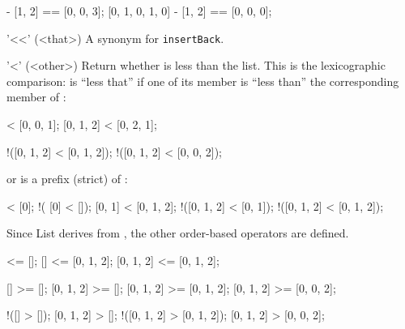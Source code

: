 \begin{urbiscriptapi}
\begin{urbiassert}
[0, 1, 0, 2, 3] - [1, 2] == [0, 0, 3];
[0, 1, 0, 1, 0] - [1, 2] == [0, 0, 0];
\end{urbiassert}

\item['<<'](<that>)%
  A synonym for \lstinline|insertBack|.

\item['<'](<other>)%
  Return whether \this is less than the  list.  This is the
  lexicographic comparison: \this is ``less that'' if one of its member is
  ``less than'' the corresponding member of :

\begin{urbiassert}
  [0, 0, 0] < [0, 0, 1];
  [0, 1, 2] < [0, 2, 1];

!([0, 1, 2] < [0, 1, 2]);
!([0, 1, 2] < [0, 0, 2]);
\end{urbiassert}

  \noindent
  or  is a prefix (strict) of \this:

\begin{urbiassert}
           [] < [0];          !(      [0] < []);
       [0, 1] < [0, 1, 2];    !([0, 1, 2] < [0, 1]);
  !([0, 1, 2] < [0, 1, 2]);
\end{urbiassert}

  Since List derives from , the other order-based
  operators are defined.

\begin{urbiassert}
        [] <= [];
        [] <= [0, 1, 2];
 [0, 1, 2] <= [0, 1, 2];

        [] >= [];
 [0, 1, 2] >= [];
 [0, 1, 2] >= [0, 1, 2];
 [0, 1, 2] >= [0, 0, 2];

       !([] > []);
  [0, 1, 2] > [];
!([0, 1, 2] > [0, 1, 2]);
  [0, 1, 2] > [0, 0, 2];
\end{urbiassert}
\end{urbiscriptapi}

